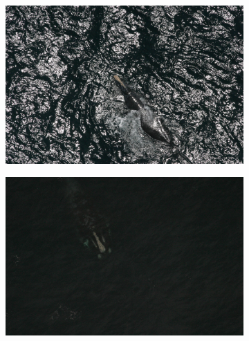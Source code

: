 \documentclass[12pt,a4paper]{report}
\begin{document}
\begin{spacing}{1.5}
\begin{figure}[H] %
\begin{subfigure}{0.55\textwidth}
\includegraphics[width=\linewidth]{figures/whalesImg/w1.jpg}
\end{subfigure}\hspace*{\fill}
\begin{subfigure}{0.55\textwidth}
\includegraphics[width=\linewidth]{figures/whalesImg/w2.jpg}
\end{subfigure}


\end{figure}
\end{spacing}
\end{document}
